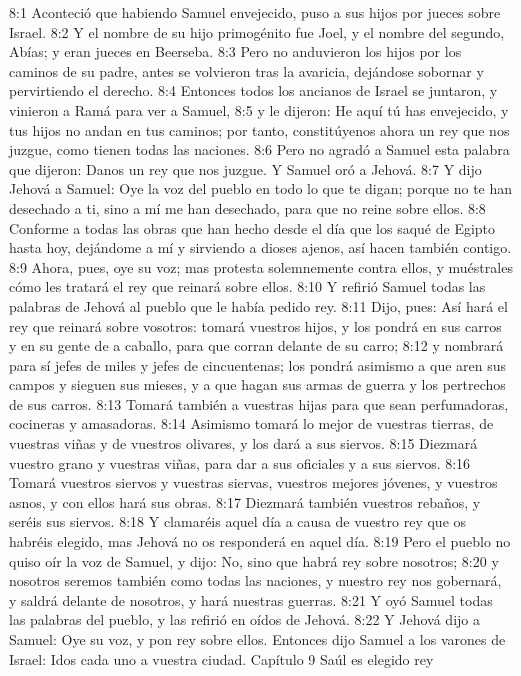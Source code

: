 8:1 Aconteció que habiendo Samuel envejecido, puso a sus hijos por jueces sobre Israel.  
8:2 Y el nombre de su hijo primogénito fue Joel, y el nombre del segundo, Abías; y eran jueces en Beerseba.  
8:3 Pero no anduvieron los hijos por los caminos de su padre, antes se volvieron tras la avaricia, dejándose sobornar y pervirtiendo el derecho.  
8:4 Entonces todos los ancianos de Israel se juntaron, y vinieron a Ramá para ver a Samuel,  
8:5 y le dijeron: He aquí tú has envejecido, y tus hijos no andan en tus caminos; por tanto, constitúyenos ahora un rey que nos juzgue, como tienen todas las naciones. 
8:6 Pero no agradó a Samuel esta palabra que dijeron: Danos un rey que nos juzgue. Y Samuel oró a Jehová.  
8:7 Y dijo Jehová a Samuel: Oye la voz del pueblo en todo lo que te digan; porque no te han desechado a ti, sino a mí me han desechado, para que no reine sobre ellos.  
8:8 Conforme a todas las obras que han hecho desde el día que los saqué de Egipto hasta hoy, dejándome a mí y sirviendo a dioses ajenos, así hacen también contigo.  
8:9 Ahora, pues, oye su voz; mas protesta solemnemente contra ellos, y muéstrales cómo les tratará el rey que reinará sobre ellos.  
8:10 Y refirió Samuel todas las palabras de Jehová al pueblo que le había pedido rey.  
8:11 Dijo, pues: Así hará el rey que reinará sobre vosotros: tomará vuestros hijos, y los pondrá en sus carros y en su gente de a caballo, para que corran delante de su carro;  
8:12 y nombrará para sí jefes de miles y jefes de cincuentenas; los pondrá asimismo a que aren sus campos y sieguen sus mieses, y a que hagan sus armas de guerra y los pertrechos de sus carros.  
8:13 Tomará también a vuestras hijas para que sean perfumadoras, cocineras y amasadoras.  
8:14 Asimismo tomará lo mejor de vuestras tierras, de vuestras viñas y de vuestros olivares, y los dará a sus siervos.  
8:15 Diezmará vuestro grano y vuestras viñas, para dar a sus oficiales y a sus siervos.  
8:16 Tomará vuestros siervos y vuestras siervas, vuestros mejores jóvenes, y vuestros asnos, y con ellos hará sus obras.  
8:17 Diezmará también vuestros rebaños, y seréis sus siervos.  
8:18 Y clamaréis aquel día a causa de vuestro rey que os habréis elegido, mas Jehová no os responderá en aquel día.  
8:19 Pero el pueblo no quiso oír la voz de Samuel, y dijo: No, sino que habrá rey sobre nosotros;  
8:20 y nosotros seremos también como todas las naciones, y nuestro rey nos gobernará, y saldrá delante de nosotros, y hará nuestras guerras.  
8:21 Y oyó Samuel todas las palabras del pueblo, y las refirió en oídos de Jehová.  
8:22 Y Jehová dijo a Samuel: Oye su voz, y pon rey sobre ellos. Entonces dijo Samuel a los varones de Israel: Idos cada uno a vuestra ciudad.  
Capítulo 9
Saúl es elegido rey  


